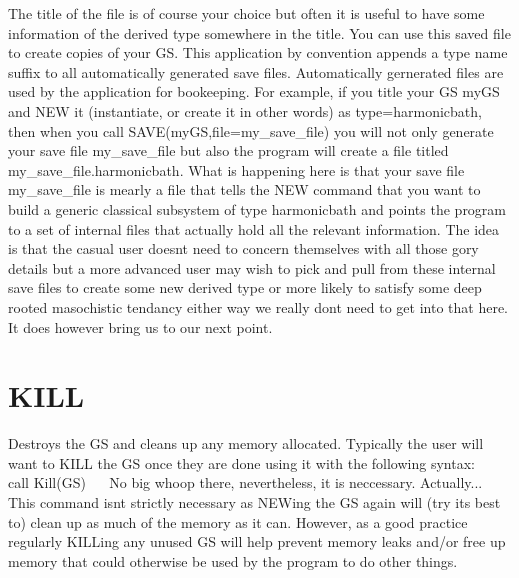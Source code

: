 The title of the file is of course your choice but often it is useful to have some information of the derived type somewhere in the title. You can use this saved file to create copies of your GS. This application by convention appends a type name suffix to all automatically generated save files. Automatically gernerated files are used by the application for bookeeping. For example, if you title your GS \textquotesingle{}my\+GS\textquotesingle{} and N\+EW it (instantiate, or create it in other words) as type=\textquotesingle{}harmonicbath\textquotesingle{}, then when you call S\+A\+VE(my\+GS,file=\textquotesingle{}my\+\_\+save\+\_\+file\textquotesingle{}) you will not only generate your save file \textquotesingle{}my\+\_\+save\+\_\+file\textquotesingle{} but also the program will create a file titled \textquotesingle{}my\+\_\+save\+\_\+file.\+harmonicbath\textquotesingle{}. What is happening here is that your save file \textquotesingle{}my\+\_\+save\+\_\+file\textquotesingle{} is mearly a file that tells the N\+EW command that you want to build a generic classical subsystem of type \textquotesingle{}harmonicbath\textquotesingle{} and points the program to a set of internal files that actually hold all the relevant information. The idea is that the casual user doesn\textquotesingle{}t need to concern themselves with all those gory details but a more advanced user may wish to pick and pull from these internal save files to create some new derived type or more likely to satisfy some deep rooted masochistic tendancy either way we really don\textquotesingle{}t need to get into that here. It does however bring us to our next point.~\newline
\hypertarget{_interface_KILL}{}\section{K\+I\+LL}\label{_interface_KILL}
Destroys the GS and cleans up any memory allocated. Typically the user will want to K\+I\+LL the GS once they are done using it with the following syntax\+:~\newline
~\newline
 call Kill(\+G\+S)~\newline
~\newline
No big whoop there, nevertheless, it is neccessary. Actually... This command isn\textquotesingle{}t strictly necessary as N\+E\+Wing the GS again will (try it\textquotesingle{}s best to) clean up as much of the memory as it can. However, as a good practice regularly K\+I\+L\+Ling any unused GS will help prevent memory leaks and/or free up memory that could otherwise be used by the program to do other things.~\newline
